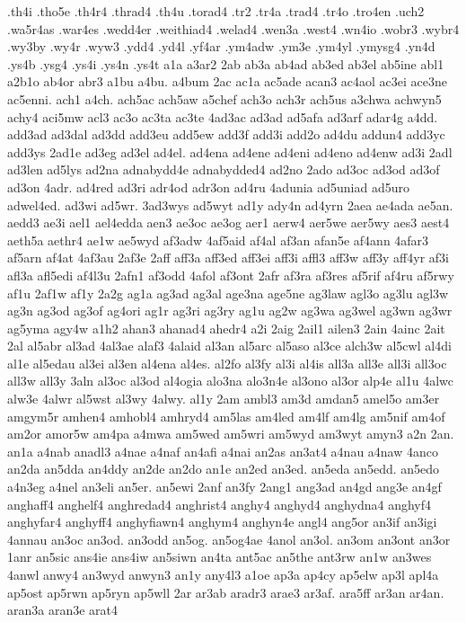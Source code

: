 {.th4i
.tho5e
.th4r4
.thrad4
.th4u
.torad4
.tr2
.tr4a
.trad4
.tr4o
.tro4en
.uch2
.wa5r4as
.war4es
.wedd4er
.weithiad4
.welad4
.wen3a
.west4
.wn4io
.wobr3
.wybr4
.wy3by
.wy4r
.wyw3
.ydd4
.yd4l
.yf4ar
.ym4adw
.ym3e
.ym4yl
.ymysg4
.yn4d
.ys4b
.ysg4
.ys4i
.ys4n
.ys4t
a1a
a3ar2
2ab
ab3a
ab4ad
ab3ed
ab3el
ab5ine
abl1
a2b1o
ab4or
abr3
a1bu
a4bu.
a4bum
2ac
ac1a
ac5ade
acan3
ac4aol
ac3ei
ace3ne
ac5enni.
ach1
a4ch.
ach5ac
ach5aw
a5chef
ach3o
ach3r
ach5us
a3chwa
achwyn5
achy4
aci5mw
acl3
ac3o
ac3ta
ac3te
4ad3ac
ad3ad
ad5afa
ad3arf
adar4g
a4dd.
add3ad
ad3dal
ad3dd
add3eu
add5ew
add3f
add3i
add2o
ad4du
addun4
add3yc
add3ys
2ad1e
ad3eg
ad3el
ad4el.
ad4ena
ad4ene
ad4eni
ad4eno
ad4enw
ad3i
2adl
ad3len
ad5lys
ad2na
adnabydd4e
adnabydded4
ad2no
2ado
ad3oc
ad3od
ad3of
ad3on
4adr.
ad4red
ad3ri
adr4od
adr3on
ad4ru
4adunia
ad5uniad
ad5uro
adwel4ed.
ad3wi
ad5wr.
3ad3wys
ad5wyt
ad1y
ady4n
ad4yrn
2aea
ae4ada
ae5an.
aedd3
ae3i
ael1
ael4edda
aen3
ae3oc
ae3og
aer1
aerw4
aer5we
aer5wy
aes3
aest4
aeth5a
aethr4
ae1w
ae5wyd
af3adw
4af5aid
af4al
af3an
afan5e
af4ann
4afar3
af5arn
af4at
4af3au
2af3e
2aff
aff3a
aff3ed
aff3ei
aff3i
affl3
aff3w
aff3y
aff4yr
af3i
afl3a
afl5edi
af4l3u
2afn1
af3odd
4afol
af3ont
2afr
af3ra
af3res
af5rif
af4ru
af5rwy
af1u
2af1w
af1y
2a2g
ag1a
ag3ad
ag3al
age3na
age5ne
ag3law
agl3o
ag3lu
agl3w
ag3n
ag3od
ag3of
ag4ori
ag1r
ag3ri
ag3ry
ag1u
ag2w
ag3wa
ag3wel
ag3wn
ag3wr
ag5yma
agy4w
a1h2
ahan3
ahanad4
ahedr4
a2i
2aig
2ail1
ailen3
2ain
4ainc
2ait
2al
al5abr
al3ad
4al3ae
alaf3
4alaid
al3an
al5arc
al5aso
al3ce
alch3w
al5cwl
al4di
al1e
al5edau
al3ei
al3en
al4ena
al4es.
al2fo
al3fy
al3i
al4is
all3a
all3e
all3i
all3oc
all3w
all3y
3aln
al3oc
al3od
al4ogia
alo3na
alo3n4e
al3ono
al3or
alp4e
al1u
4alwc
alw3e
4alwr
al5wst
al3wy
4alwy.
al1y
2am
ambl3
am3d
amdan5
amel5o
am3er
amgym5r
amhen4
amhobl4
amhryd4
am5las
am4led
am4lf
am4lg
am5nif
am4of
am2or
amor5w
am4pa
a4mwa
am5wed
am5wri
am5wyd
am3wyt
amyn3
a2n
2an.
an1a
a4nab
anadl3
a4nae
a4naf
an4afi
a4nai
an2as
an3at4
a4nau
a4naw
4anco
an2da
an5dda
an4ddy
an2de
an2do
an1e
an2ed
an3ed.
an5eda
an5edd.
an5edo
a4n3eg
a4nel
an3eli
an5er.
an5ewi
2anf
an3fy
2ang1
ang3ad
an4gd
ang3e
an4gf
anghaff4
anghelf4
anghredad4
anghrist4
anghy4
anghyd4
anghydna4
anghyf4
anghyfar4
anghyff4
anghyfiawn4
anghym4
anghyn4e
angl4
ang5or
an3if
an3igi
4annau
an3oc
an3od.
an3odd
an5og.
an5og4ae
4anol
an3ol.
an3om
an3ont
an3or
1anr
an5sic
ans4ie
ans4iw
an5siwn
an4ta
ant5ac
an5the
ant3rw
an1w
an3wes
4anwl
anwy4
an3wyd
anwyn3
an1y
any4l3
a1oe
ap3a
ap4cy
ap5elw
ap3l
apl4a
ap5ost
ap5rwn
ap5ryn
ap5wll
2ar
ar3ab
aradr3
arae3
ar3af.
ara5ff
ar3an
ar4an.
aran3a
aran3e
arat4
}
